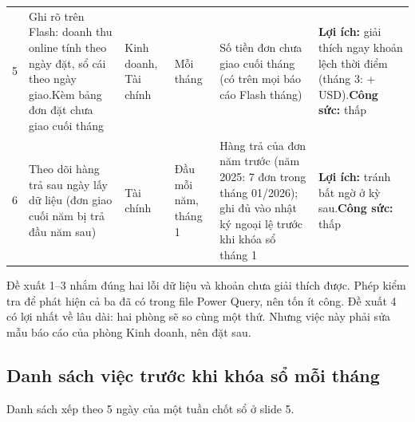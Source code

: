 \begin{table}[H]
{\begin{tabular}{@{}L{0.3cm} L{3.6cm} L{1.6cm} L{2.0cm} L{3.4cm} L{3.4cm}@{}}
5 & Ghi rõ trên Flash: doanh thu online tính theo ngày đặt, sổ cái theo ngày giao.\newline Kèm bảng đơn đặt chưa giao cuối tháng & Kinh doanh, Tài chính & Mỗi tháng & Số tiền đơn chưa giao cuối tháng (có trên mọi báo cáo Flash tháng) & \textbf{Lợi ích:} giải thích ngay khoản lệch thời điểm (tháng 3: +\SoLechOnlineMax{} USD).\newline \textbf{Công sức:} thấp \\
6 & Theo dõi hàng trả sau ngày lấy dữ liệu (đơn giao cuối năm bị trả đầu năm sau) & Tài chính & Đầu mỗi năm, tháng 1 & Hàng trả của đơn năm trước (năm 2025: 7 đơn trong tháng 01/2026); ghi đủ vào nhật ký ngoại lệ trước khi khóa sổ tháng 1 & \textbf{Lợi ích:} tránh bất ngờ ở kỳ sau.\newline \textbf{Công sức:} thấp \\
\bottomrule
\end{tabular}}
\end{table}

Đề xuất 1–3 nhắm đúng hai lỗi dữ liệu và khoản chưa giải thích được. Phép kiểm tra để phát hiện cả ba đã có trong file Power Query, nên tốn ít công. Đề xuất 4 có lợi nhất về lâu dài: hai phòng sẽ so cùng một thứ. Nhưng việc này phải sửa mẫu báo cáo của phòng Kinh doanh, nên đặt sau.

\subsection{Danh sách việc trước khi khóa sổ mỗi tháng}

Danh sách xếp theo 5 ngày của một tuần chốt sổ ở slide 5.

